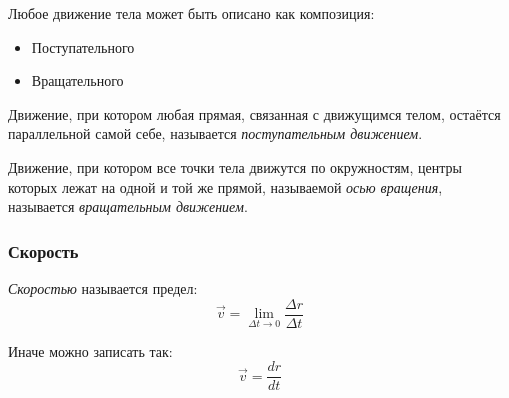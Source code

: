 Любое движение тела может быть описано как композиция:
\begin{itemize}
    \item Поступательного
    \item Вращательного
\end{itemize}

\begin{definition}
    Движение, при котором любая прямая, связанная с движущимся телом, остаётся параллельной самой себе, называется \textit{поступательным движением}.
\end{definition}

\begin{definition}
    Движение, при котором все точки тела движутся по окружностям, центры которых лежат на одной и той же прямой, называемой \textit{осью вращения}, называется \textit{вращательным движением}. 
\end{definition}

\subsubsection{Скорость}

\begin{definition}[Скорость]
    \textit{Скоростью} называется предел: \[
        \vec{v} = \lim_{\Delta t \to 0} \frac{\Delta r}{\Delta t} 
    \]
\end{definition}

Иначе можно записать так: \[
    \vec{v} = \frac{dr}{dt}
\]

